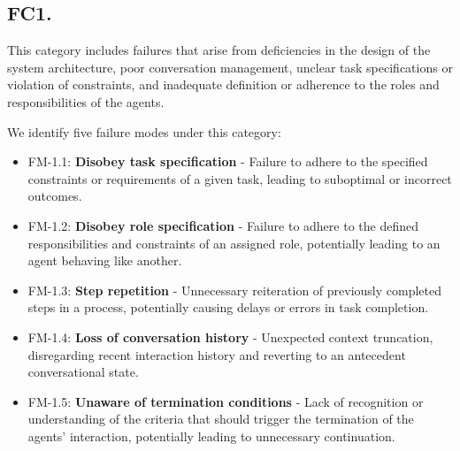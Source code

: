 \subsection{FC1. \fcI}

This category includes failures that arise from deficiencies in the design of the system architecture, poor conversation management, unclear task specifications or violation of constraints, and inadequate definition or adherence to the roles and responsibilities of the agents.


We identify five failure modes under this category:

\begin{itemize}

\item FM-1.1: \textbf{Disobey task specification} - Failure to adhere to the specified constraints or requirements of a given task, leading to suboptimal or incorrect outcomes.


\item FM-1.2: \textbf{Disobey role specification} - Failure to adhere to the defined responsibilities and constraints of an assigned role, potentially leading to an agent behaving like another.

\item FM-1.3: \textbf{Step repetition} - Unnecessary reiteration of previously completed steps in a process, potentially causing delays or errors in task completion.

\item FM-1.4: \textbf{Loss of conversation history} - Unexpected context truncation, disregarding recent interaction history and reverting to an antecedent conversational state.

\item FM-1.5: \textbf{Unaware of termination conditions} - Lack of recognition or understanding of the criteria that should trigger the termination of the agents' interaction, potentially leading to unnecessary continuation. 

\end{itemize}

